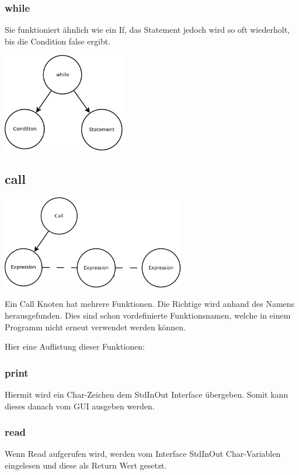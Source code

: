 \subsubsection{while}
Sie funktioniert ähnlich wie ein If, das Statement jedoch wird so oft wiederholt, bis die Condition false ergibt.

\includegraphics[width=0.4\textwidth]{./media/images/interpreter/syntaxbaum/statements/while.png}

\subsection{call}
\includegraphics[width=0.6\textwidth]{./media/images/interpreter/syntaxbaum/statements/call.png}

Ein Call Knoten hat mehrere Funktionen. Die Richtige wird anhand des Namens herausgefunden. Dies sind schon vordefinierte
Funktionsnamen, welche in einem Programm nicht erneut verwendet werden können.

Hier eine Auflistung dieser Funktionen:

\subsubsection{print}
Hiermit wird ein Char-Zeichen dem StdInOut Interface übergeben. Somit kann dieses danach vom GUI ausgeben werden.

\subsubsection{read}
Wenn Read aufgerufen wird, werden vom Interface StdInOut Char-Variablen eingelesen und diese als Return Wert gesetzt.

